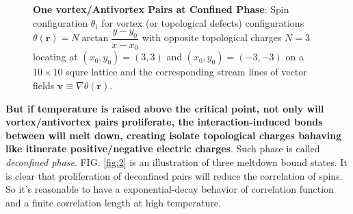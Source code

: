 \documentclass[10pt,nofootinbib]{revtex4}
\begin{document}
\begin{figure}[!htp]
			\caption{{\bf One vortex/Antivortex Pairs at Confined Phase}: Spin configuration $\theta_i$ for vortex (or topological defects) configurations $\theta(\bm{r})=N\arctan\dfrac{y-y_0}{x-x_0}$ with opposite topological charges $N=3$ locating at $(x_0,y_0)=(3,3)$ and $(x_0,y_0)=(-3,-3)$ on a $10\times 10$ squre lattice and the corresponding stream lines of vector fields $\bm{v}\equiv\nabla\theta(\bm{r})$.}
			\label{fig:1}
		\end{figure}
		\textbf{But if temperature is raised above the critical point, not only will vortex/antivortex pairs proliferate, the interaction-induced bonds between will melt down, creating isolate topological charges bahaving like itinerate positive/negative electric charges}. Such phase is called \emph{deconfined phase}. FIG. \ref{fig:2} is an illustration of three meltdown bound states. It is clear that proliferation of deconfined pairs will reduce the correlation of spins. So it's reasonable to have a exponential-decay behavior of correlation function and a finite correlation length at high temperature.
\end{document}
